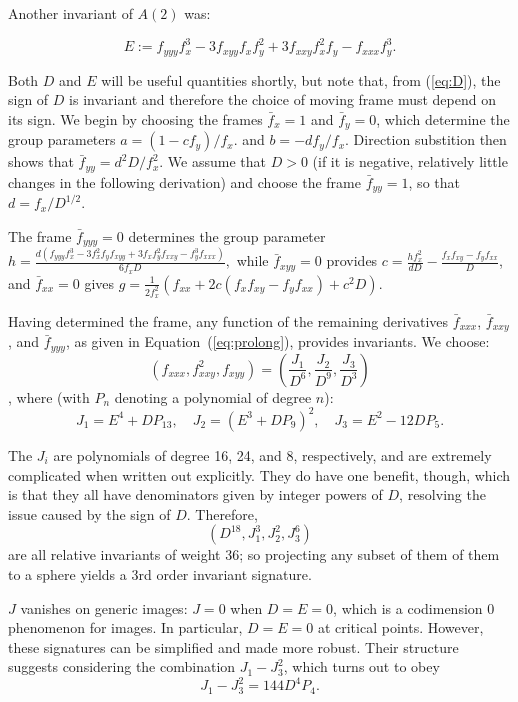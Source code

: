 \documentclass[review,onefignum,onetabnum]{siamonline190516}
\def\R{\mathbb{R}}
\begin{document}
{Another invariant of $A(2)$ was:

\begin{equation}
E := f_{yyy}f_x^3 - 3 f_{xyy}f_x f_y^2 + 3 f_{xxy}f_x^2 f_y - f_{xxx}f_y^3.
\end{equation}

Both $D$ and $E$ will be useful quantities shortly, but note that, from (\ref{eq:D}), the sign of $D$ is invariant and therefore the choice of moving frame must depend on its sign. We begin by choosing the frames $\bar f_x = 1$ and $\bar f_y=  0$, which determine the group parameters $a = (1-c f_y)/f_x.$ and $b = -d f_y/f_x$. Direction substition then shows that $\bar f_{yy} = d^2 D/f_x^2$. We assume that $D>0$ (if it is negative, relatively little changes in the following derivation) and choose the frame $\bar f_{yy} = 1$, so that $d = f_x/D^{1/2}.$

The frame $\bar f_{yyy} = 0$ determines the group parameter $ h = \frac{d(f_{yyy}f_x^3 - 3 f_x^2 f_y f_{xyy} + 3 f_x f_y^2 f_{xxy} - f_y^3 f_{xxx})}{6 f_x D},$ while $\bar f_{xyy}=0$ provides $ c = \frac{h f_x^2}{d D} - \frac{f_x f_{xy} - f_y f_{xx}}{D}$, and $\bar f_{xx}=0$ gives $ g = \frac{1}{2 f_x^2}(f_{xx} + 2 c ( f_x f_{xy} - f_y f_{xx} ) + c^2 D).$

Having determined the frame, any function of the remaining derivatives $\bar f_{xxx}$, $\bar f_{xxy}$, and $\bar f_{yyy}$, as given in Equation~(\ref{eq:prolong}), provides invariants. We choose: $$ (f_{xxx}, f_{xxy}^2, f_{xyy})=\left(\frac{J_1}{D^6},\frac{J_2}{D^9},\frac{J_3}{D^3}\right)$$, where (with $P_n$ denoting a polynomial of degree $n$):
$$ J_1 = E^4 + D P_{13},\quad J_2 = (E^3 + D P_9)^2,\quad J_3=E^2 -12 D P_5.$$

The $J_i$ are polynomials of degree 16, 24, and 8, respectively, and are extremely complicated when written out explicitly. They do have one benefit, though, which is that they  all have denominators given by integer powers of $D$, resolving the issue caused by the sign of $D$. Therefore, $$ (D^{18}, J_1^3, J_2^2, J_3^6)$$ are all relative invariants of weight 36; so projecting any subset of them of them to a sphere yields a 3rd order invariant signature.

$J$ vanishes on generic images: $J=0$ when $D=E=0$, which is a codimension 0 phenomenon for images. In particular, $D=E=0$ at critical points.  However, these signatures can be simplified and made more robust. Their structure suggests considering the combination $J_1 - J_3^2$, which turns out to obey
$$J_1 - J_3^2 = 144 D^4 P_4.$$

}
\end{document}
